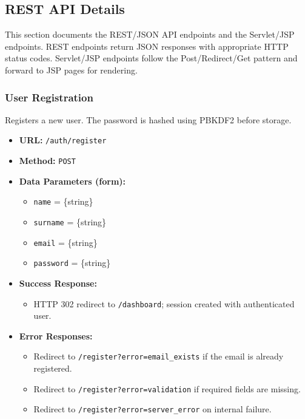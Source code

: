 \subsection{REST API Details}

This section documents the REST/JSON API endpoints and the Servlet/JSP endpoints. REST endpoints return JSON responses with appropriate HTTP status codes. Servlet/JSP endpoints follow the Post/Redirect/Get pattern and forward to JSP pages for rendering.


\subsubsection{User Registration}

Registers a new user. The password is hashed using PBKDF2 before storage.

\begin{itemize}
    \item \textbf{URL:} \texttt{/auth/register}
    \item \textbf{Method:} \texttt{POST}
    \item \textbf{Data Parameters (form):}
    \begin{itemize}
        \item \texttt{name} = \{string\}
        \item \texttt{surname} = \{string\}
        \item \texttt{email} = \{string\}
        \item \texttt{password} = \{string\}
    \end{itemize}
    \item \textbf{Success Response:}
    \begin{itemize}
        \item HTTP 302 redirect to \texttt{/dashboard}; session created with authenticated user.
    \end{itemize}
    \item \textbf{Error Responses:}
    \begin{itemize}
        \item Redirect to \texttt{/register?error=email\_exists} if the email is already registered.
        \item Redirect to \texttt{/register?error=validation} if required fields are missing.
        \item Redirect to \texttt{/register?error=server\_error} on internal failure.
    \end{itemize}
\end{itemize}

